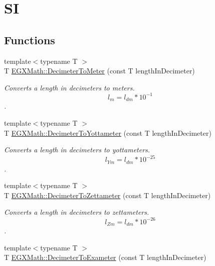 \hypertarget{group___e_g_x_math-_conversions-_length_conversions-_decimeter-_s_i}{}\section{SI}
\label{group___e_g_x_math-_conversions-_length_conversions-_decimeter-_s_i}
\subsection*{Functions}
\begin{DoxyCompactItemize}
\item 
{\footnotesize template$<$typename T $>$ }\\T \mbox{\hyperlink{group___e_g_x_math-_conversions-_length_conversions-_decimeter-_s_i_ga51fdff755420d79cc7c4cab051a1e820}{E\+G\+X\+Math\+::\+Decimeter\+To\+Meter}} (const T length\+In\+Decimeter)
\begin{DoxyCompactList}\small\item\em Converts a length in decimeters to meters. \[ l_{m}=l_{dm} * 10^{-1} \]. \end{DoxyCompactList}\item 
{\footnotesize template$<$typename T $>$ }\\T \mbox{\hyperlink{group___e_g_x_math-_conversions-_length_conversions-_decimeter-_s_i_ga47bb0274bb352706479e9f103686669b}{E\+G\+X\+Math\+::\+Decimeter\+To\+Yottameter}} (const T length\+In\+Decimeter)
\begin{DoxyCompactList}\small\item\em Converts a length in decimeters to yottameters. \[ l_{Ym}=l_{dm} * 10^{-25} \]. \end{DoxyCompactList}\item 
{\footnotesize template$<$typename T $>$ }\\T \mbox{\hyperlink{group___e_g_x_math-_conversions-_length_conversions-_decimeter-_s_i_ga11b07d4dcd18209ab0b2cb3b2f0bdb59}{E\+G\+X\+Math\+::\+Decimeter\+To\+Zettameter}} (const T length\+In\+Decimeter)
\begin{DoxyCompactList}\small\item\em Converts a length in decimeters to zettameters. \[ l_{Zm}=l_{dm} * 10^{-26} \]. \end{DoxyCompactList}\item 
{\footnotesize template$<$typename T $>$ }\\T \mbox{\hyperlink{group___e_g_x_math-_conversions-_length_conversions-_decimeter-_s_i_ga9ee5daca58b2e6431c94ca9b8d5180b6}{E\+G\+X\+Math\+::\+Decimeter\+To\+Exameter}} (const T length\+In\+Decimeter)

\end{DoxyCompactItemize}
